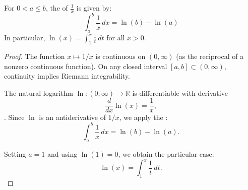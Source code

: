 \begin{proposition} \label{proposition:integral_of_reciprocal_is_natural_logarithm}
For $0 < a \leq b$, the  of $\frac{1}{x}$ is given by:
$$\int_a^b \frac{1}{x} \, dx = \ln(b) - \ln(a)$$
In particular, $\ln(x) = \int_1^x \frac{1}{t} \, dt$ for all $x > 0$.
\end{proposition}
\begin{proof}
    The function $x \mapsto 1/x$ is continuous on $(0, \infty)$ (as the reciprocal of a nonzero continuous function). On any closed interval $[a, b] \subset (0, \infty)$, continuity implies Riemann integrability.

    The natural logarithm $\ln : (0, \infty) \to \mathbb{R}$ is differentiable with derivative
    $$\frac{d}{dx} \ln(x) = \frac{1}{x},$$
    . Since $\ln$ is an antiderivative of $1/x$, we apply the :
    $$\int_a^b \frac{1}{x}\,dx = \ln(b) - \ln(a).$$

    Setting $a = 1$ and using $\ln(1) = 0$, we obtain the particular case:
    $$\ln(x) = \int_1^x \frac{1}{t}\,dt.$$
\end{proof}
